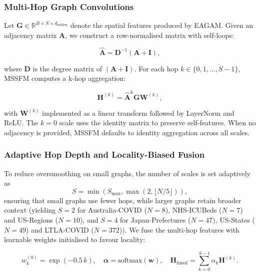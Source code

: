 \documentclass[final,1p,times]{elsarticle}
\begin{document}
\subsubsection{Multi-Hop Graph Convolutions}

Let $\mathbf{G} \in \mathbb{R}^{B \times N \times d_{\text{hidden}}}$ denote the spatial features produced by EAGAM. Given an adjacency matrix $\mathbf{A}$, we construct a row-normalised matrix with self-loops:

\begin{equation}
\mathbf{\hat{A}} = \mathbf{D}^{-1}(\mathbf{A} + \mathbf{I}),
\end{equation}

where $\mathbf{D}$ is the degree matrix of $(\mathbf{A} + \mathbf{I})$. For each hop $k \in \{0, 1, \ldots, S-1\}$, MSSFM computes a k-hop aggregation:

\begin{equation}
\mathbf{H}^{(k)} = \mathbf{\hat{A}}^{k}\mathbf{G}\mathbf{W}^{(k)},
\end{equation}

with $\mathbf{W}^{(k)}$ implemented as a linear transform followed by LayerNorm and ReLU. The $k=0$ scale uses the identity matrix to preserve self-features. When no adjacency is provided, MSSFM defaults to identity aggregation across all scales.

\subsubsection{Adaptive Hop Depth and Locality-Biased Fusion}

To reduce oversmoothing on small graphs, the number of scales is set adaptively as
\begin{equation}
S = \min(S_{\max}, \max(2, \lfloor N/5 \rfloor)),
\end{equation}
ensuring that small graphs use fewer hops, while larger graphs retain broader context (yielding $S=2$ for Australia-COVID ($N{=}8$), NHS-ICUBeds ($N{=}7$) and US-Regions ($N{=}10$), and $S=4$ for Japan-Prefectures ($N{=}47$), US-States ($N{=}49$) and LTLA-COVID ($N{=}372$)). We fuse the multi-hop features with learnable weights initialised to favour locality:

\begin{equation}
w_k^{(0)} = \exp(-0.5\,k), \quad
\boldsymbol{\alpha} = \text{softmax}(\mathbf{w}), \quad
\mathbf{H}_{\text{fused}} = \sum_{k=0}^{S-1} \alpha_k \mathbf{H}^{(k)}.
\end{equation}
\end{document}
